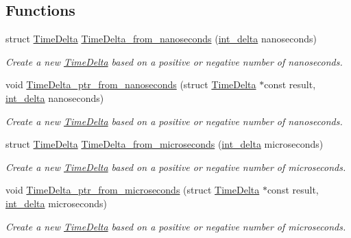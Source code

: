 \subsection*{Functions}
\begin{DoxyCompactItemize}
\item 
struct \hyperlink{structTimeDelta}{Time\-Delta} \hyperlink{time-delta_8h_a4d69e5c655907802b1278e2bc0567c6b}{Time\-Delta\-\_\-from\-\_\-nanoseconds} (\hyperlink{types_8h_a8a67cf99971c5cfeeaa2380ba84a4c92}{int\-\_\-delta} nanoseconds)
\begin{DoxyCompactList}\small\item\em Create a new \hyperlink{structTimeDelta}{Time\-Delta} based on a positive or negative number of nanoseconds. \end{DoxyCompactList}\item 
void \hyperlink{time-delta_8h_a3034684978be24e39673a1864366259c}{Time\-Delta\-\_\-ptr\-\_\-from\-\_\-nanoseconds} (struct \hyperlink{structTimeDelta}{Time\-Delta} $\ast$const result, \hyperlink{types_8h_a8a67cf99971c5cfeeaa2380ba84a4c92}{int\-\_\-delta} nanoseconds)
\begin{DoxyCompactList}\small\item\em Create a new \hyperlink{structTimeDelta}{Time\-Delta} based on a positive or negative number of nanoseconds. \end{DoxyCompactList}\item 
struct \hyperlink{structTimeDelta}{Time\-Delta} \hyperlink{time-delta_8h_a8a5b10cada34e6093d985bb757671842}{Time\-Delta\-\_\-from\-\_\-microseconds} (\hyperlink{types_8h_a8a67cf99971c5cfeeaa2380ba84a4c92}{int\-\_\-delta} microseconds)
\begin{DoxyCompactList}\small\item\em Create a new \hyperlink{structTimeDelta}{Time\-Delta} based on a positive or negative number of microseconds. \end{DoxyCompactList}\item 
void \hyperlink{time-delta_8h_a25033c49c971d5e722daf0d3032c087c}{Time\-Delta\-\_\-ptr\-\_\-from\-\_\-microseconds} (struct \hyperlink{structTimeDelta}{Time\-Delta} $\ast$const result, \hyperlink{types_8h_a8a67cf99971c5cfeeaa2380ba84a4c92}{int\-\_\-delta} microseconds)
\begin{DoxyCompactList}\small\item\em Create a new \hyperlink{structTimeDelta}{Time\-Delta} based on a positive or negative number of microseconds. \end{DoxyCompactList}\item 

\end{DoxyCompactItemize}
